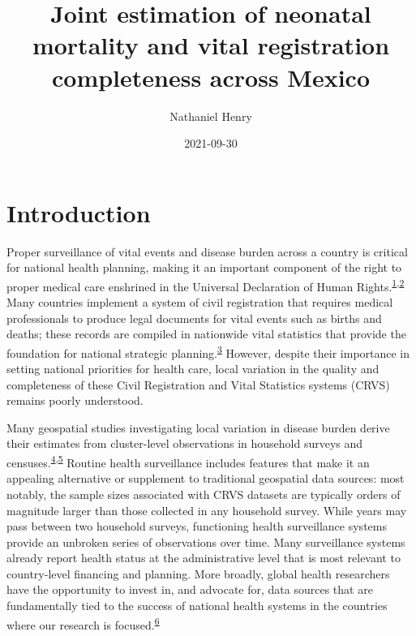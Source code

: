 \documentclass[
]{article}
\title{Joint estimation of neonatal mortality and vital registration completeness across Mexico}
\author{Nathaniel Henry\textsuperscript{}}
\date{2021-09-30}
\begin{document}
\maketitle

\hypertarget{introduction}{%
\section{Introduction}\label{introduction}}

Proper surveillance of vital events and disease burden across a country is critical for national health planning, making it an important component of the right to proper medical care enshrined in the Universal Declaration of Human Rights.\textsuperscript{\protect\hyperlink{ref-Setel2007}{1},\protect\hyperlink{ref-srs}{2}} Many countries implement a system of civil registration that requires medical professionals to produce legal documents for vital events such as births and deaths; these records are compiled in nationwide vital statistics that provide the foundation for national strategic planning.\textsuperscript{\protect\hyperlink{ref-Abouzahr2005}{3}} However, despite their importance in setting national priorities for health care, local variation in the quality and completeness of these Civil Registration and Vital Statistics systems (CRVS) remains poorly understood.

Many geospatial studies investigating local variation in disease burden derive their estimates from cluster-level observations in household surveys and censuses.\textsuperscript{\protect\hyperlink{ref-Diggle2016}{4},\protect\hyperlink{ref-Wakefield2020}{5}} Routine health surveillance includes features that make it an appealing alternative or supplement to traditional geospatial data sources: most notably, the sample sizes associated with CRVS datasets are typically orders of magnitude larger than those collected in any household survey. While years may pass between two household surveys, functioning health surveillance systems provide an unbroken series of observations over time. Many surveillance systems already report health status at the administrative level that is most relevant to country-level financing and planning. More broadly, global health researchers have the opportunity to invest in, and advocate for, data sources that are fundamentally tied to the success of national health systems in the countries where our research is focused.\textsuperscript{\protect\hyperlink{ref-AbouZahr2015}{6}}
\end{document}
